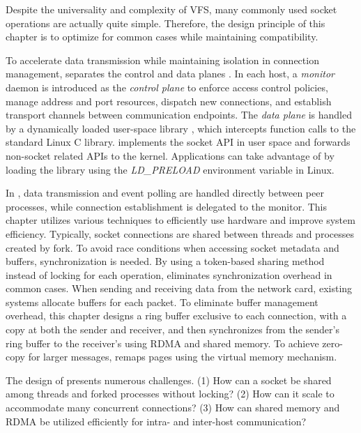 Despite the universality and complexity of VFS, many commonly used socket operations are actually quite simple. Therefore, the design principle of this chapter is to optimize for common cases while maintaining compatibility.

To accelerate data transmission while maintaining isolation in connection management, \sys{} separates the control and data planes \cite {peter2016arrakis}.
In each host, a \emph {monitor} daemon is introduced as the \emph {control plane} to enforce access control policies, manage address and port resources, dispatch new connections, and establish transport channels between communication endpoints.
The \emph {data plane} is handled by a dynamically loaded user-space library \libipc{}, which intercepts function calls to the standard Linux C library. \libipc{} implements the socket API in user space and forwards non-socket related APIs to the kernel.
Applications can take advantage of \libipc{} by loading the library using the \emph {LD\_PRELOAD} environment variable in Linux.

In \sys{}, data transmission and event polling are handled directly between peer processes, while connection establishment is delegated to the monitor.
This chapter utilizes various techniques to efficiently use hardware and improve system efficiency.
Typically, socket connections are shared between threads and processes created by fork.
To avoid race conditions when accessing socket metadata and buffers, synchronization is needed.
By using a token-based sharing method instead of locking for each operation, \sys{} eliminates synchronization overhead in common cases.
When sending and receiving data from the network card, existing systems allocate buffers for each packet.
To eliminate buffer management overhead, this chapter designs a ring buffer exclusive to each connection, with a copy at both the sender and receiver, and then synchronizes from the sender's ring buffer to the receiver's using RDMA and shared memory.
To achieve zero-copy for larger messages, \sys{} remaps pages using the virtual memory mechanism.

The design of \sys{} presents numerous challenges. 
(1) How can a socket be shared among threads and forked processes without locking?
(2) How can it scale to accommodate many concurrent connections?
(3) How can shared memory and RDMA be utilized efficiently for intra- and inter-host communication?

